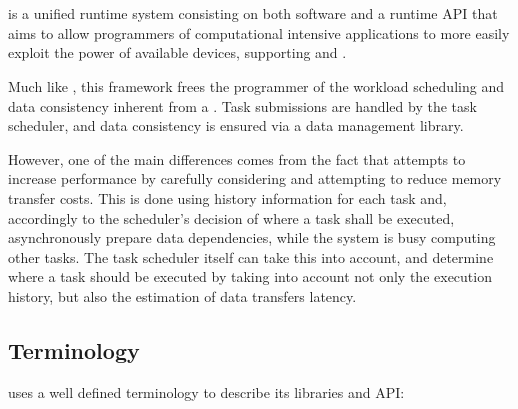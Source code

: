 \documentclass[main.tex]{subfiles}
\begin{document}
\section{\starpu} \label{chapter:starpu}

\starpu \cite{augonnet2011starpu} is a unified runtime system consisting on both software and a runtime API that aims to allow programmers of computational intensive applications to more easily exploit the power of available devices, supporting \cpus and \gpus.

Much like \gama, this framework frees the programmer of the workload scheduling and data consistency inherent from a \hetplat. Task submissions are handled by the \starpu task scheduler, and data consistency is ensured via a data management library.

However, one of the main differences comes from the fact that \starpu attempts to increase performance by carefully considering and attempting to reduce memory transfer costs. This is done using history information for each task and, accordingly to the scheduler's decision of where a task shall be executed, asynchronously prepare data dependencies, while the system is busy computing other tasks. The task scheduler itself can take this into account, and determine where a task should be executed by taking into account not only the execution history, but also the estimation of data transfers latency.

\subsection{Terminology}

\starpu uses a well defined terminology to describe its libraries and API:
\end{document}
